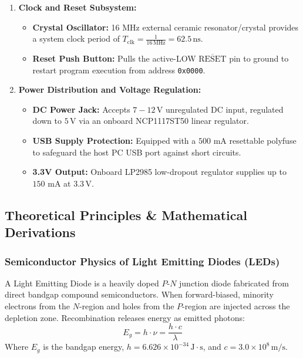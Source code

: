 \documentclass[11pt,a4paper]{article}
\begin{document}
\begin{enumerate}[leftmargin=*]
\begin{itemize}[noitemsep]
        \item Resolves voltages from $0\,\text{V}$ to $5.0\,\text{V}$ into integer values from $0$ to $1023$, yielding a voltage resolution of $Q = \frac{5.0\,\text{V}}{1024} = 4.88\,\text{mV/count}$.
    \end{itemize}
    \item \textbf{Clock and Reset Subsystem:}
    \begin{itemize}[noitemsep]
        \item \textbf{Crystal Oscillator:} 16 MHz external ceramic resonator/crystal provides a system clock period of $T_{\text{clk}} = \frac{1}{16\,\text{MHz}} = 62.5\,\text{ns}$.
        \item \textbf{Reset Push Button:} Pulls the active-LOW $\overline{\text{RESET}}$ pin to ground to restart program execution from address \texttt{0x0000}.
    \end{itemize}
    \item \textbf{Power Distribution and Voltage Regulation:}
    \begin{itemize}[noitemsep]
        \item \textbf{DC Power Jack:} Accepts $7-12\,\text{V}$ unregulated DC input, regulated down to $5\,\text{V}$ via an onboard NCP1117ST50 linear regulator.
        \item \textbf{USB Supply Protection:} Equipped with a $500\text{ mA}$ resettable polyfuse to safeguard the host PC USB port against short circuits.
        \item \textbf{3.3V Output:} Onboard LP2985 low-dropout regulator supplies up to $150\text{ mA}$ at $3.3\,\text{V}$.
    \end{itemize}
\end{enumerate}

\subsection{Theoretical Principles \& Mathematical Derivations}

\subsubsection{Semiconductor Physics of Light Emitting Diodes (LEDs)}
A Light Emitting Diode is a heavily doped $P$-$N$ junction diode fabricated from direct bandgap compound semiconductors. When forward-biased, minority electrons from the $N$-region and holes from the $P$-region are injected across the depletion zone. Recombination releases energy as emitted photons:
\begin{equation}
E_g = h \cdot \nu = \frac{h \cdot c}{\lambda}
\end{equation}
Where $E_g$ is the bandgap energy, $h = 6.626 \times 10^{-34}\,\text{J}\cdot\text{s}$, and $c = 3.0 \times 10^8\,\text{m/s}$.
\end{document}
